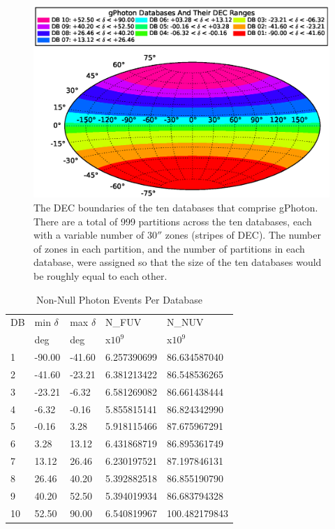 \documentclass[5p]{elsarticle}
\begin{document}
\begin{figure}
\includegraphics[scale=0.48]{FigDBDist.eps}
\caption{The DEC boundaries of the ten databases that comprise gPhoton.  There are a total of 999 partitions across the ten databases, each with a variable number of $30''$ zones (stripes of DEC).  The number of zones in each partition, and the number of partitions in each database, were assigned so that the size of the ten databases would be roughly equal to each other. \label{dbdist}}
\end{figure}


\begin{table}
\caption{Non-Null Photon Events Per Database\label{dbcounts}}
\begin{tabularx}{.47\textwidth}{lllXX}
\hline\hline
DB & min $\delta$ & max $\delta$ & N\_FUV & N\_NUV\\
   & deg          & deg          & x$10^9$ & x$10^9$\\
\hline
1 & -90.00 & -41.60 &   6.257390699 &  86.634587040\\
2 & -41.60 & -23.21 &   6.381213422 &  86.548536265\\
3 & -23.21 &  -6.32 &   6.581269082 &  86.661438444\\
4 &  -6.32 &  -0.16 &   5.855815141 &  86.824342990\\
5 &  -0.16 &   3.28 &   5.918115466 &  87.675967291\\
6 &   3.28 &  13.12 &   6.431868719 &  86.895361749\\
7 &  13.12 &  26.46 &   6.230197521 &  87.197846131\\
8 &  26.46 &  40.20 &   5.392882518 &  86.855190790\\
9 &  40.20 &  52.50 &   5.394019934 &  86.683794328\\
10 &  52.50 &  90.00 &   6.540819967 & 100.482179843\\
\hline
\end{tabularx}
\end{table}
\end{document}
